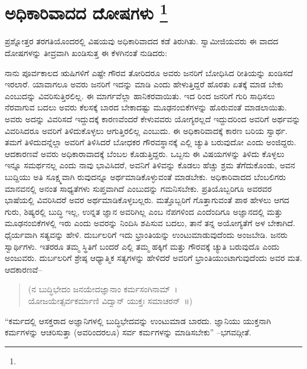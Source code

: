 
\chapter[ಅಧಿಕಾರಿವಾದದ ದೋಷಗಳು ]{ಅಧಿಕಾರಿವಾದದ ದೋಷಗಳು \protect\footnote{}}

ಪ್ರಶ್ನೋತ್ತರ ತರಗತಿಯೊಂದರಲ್ಲಿ ವಿಷಯವು ಅಧಿಕಾರಿವಾದದ ಕಡೆ ತಿರುಗಿತು. ಸ್ವಾಮೀಜಿಯವರು ಈ ವಾದದ ದೋಷಗಳನ್ನು ತೀವ್ರವಾಗಿ ಖಂಡಿಸುತ್ತ ಈ ಕೆಳಗಿನಂತೆ ನುಡಿದರು:

ನಾನು ಪೂರ್ವಕಾಲದ ಋಷಿಗಳಿಗೆ ಎಷ್ಟೇ ಗೌರವ ತೋರಿದರೂ ಅವರು ಜನರಿಗೆ ಬೋಧಿಸಿದ ರೀತಿಯನ್ನು ಖಂಡಿಸದೆ ಇರಲಾರೆ. ಯಾವಾಗಲೂ ಅವರು ಜನರಿಗೆ ಇದನ್ನು ಮಾಡಿ ಎಂದು ಹೇಳುತ್ತಿದ್ದರೆ ಹೊರತು ಏತಕ್ಕೆ ಮಾಡ ಬೇಕು ಎಂಬುದನ್ನು ವಿವರಿಸುತ್ತಿರಲಿಲ್ಲ. ಈ ಮಾರ್ಗವೆಲ್ಲಾ ಹಾನಿಕರವಾಯಿತು. ಇದ ರಿಂದ ಜನರಿಗೆ ಗುರಿ ಸಾಧಿಸಲು ನೆರವಾಗುವ ಬದಲು ಅವರು ಕೆಲಸಕ್ಕೆ ಬಾರದ ಬೇಕಾದಷ್ಟು ಮೂಢನಂಬಿಕೆಗಳನ್ನು ಹೊರುವಂತೆ ಮಾಡಲಾಯಿತು. ಅವರು ಅದನ್ನು ವಿವರಿಸದೆ ಇದ್ದುದಕ್ಕೆ ಕಾರಣವೆಂದರೆ ಕೇಳುವವರು ಯೋಗ್ಯರಲ್ಲದೆ ಇದ್ದುದರಿಂದ ಅವರಿಗೆ ಅರ್ಥವನ್ನು ವಿವರಿಸಿದರೂ ಅವರಿಗೆ ತಿಳಿದುಕೊಳ್ಳಲು ಆಗುತ್ತಿರಲಿಲ್ಲ ಎಂಬುದು. ಈ ಅಧಿಕಾರಿವಾದಕ್ಕೆ ಕಾರಣ ಬರಿಯ ಸ್ವಾರ್ಥ. ತಮಗೆ ತಿಳಿದುದನ್ನೆಲ್ಲಾ ಅವರಿಗೆ ತಿಳಿಸಿದರೆ ಬೋಧಕರ ಗೌರವಸ್ಥಾನಕ್ಕೆ ಎಲ್ಲಿ ಚ್ಯುತಿ ಬರುವುದೋ ಎಂದು ಅಂಜಿದ್ದರು. ಆದಕಾರಣವೆ ಅವರು ಅಧಿಕಾರಾವಾದಕ್ಕೆ ಬೆಂಬಲ ಕೊಡುತ್ತಿದ್ದರು. ಒಬ್ಬನು ಈ ವಿಷಯಗಳನ್ನು ತಿಳಿದು ಕೊಳ್ಳಲು ಇನ್ನೂ ಸಮರ್ಥನಲ್ಲ ಎಂದು ನಾವು ಭಾವಿಸಿದರೆ, ಅವನಿಗೆ ತಿಳಿವನ್ನು ಕೊಡಲು ಹೆಚ್ಚು ಶ್ರಮ ತೆಗೆದುಕೊಂಡು, ಅವನ ಬುದ್ದಿಯು ಅತಿ ಸೂಕ್ಷ್ಮವಾಗಿ ರುವುದನ್ನೂ ಅರ್ಥಮಾಡಿಕೊಳ್ಳುವಂತೆ ಮಾಡಬೇಕು. ಅಧಿಕಾರಿವಾದದ ಬೆಂಬಲಿಗರು ಮಾನವನಲ್ಲಿ ಅನಂತ ಸಾಧ್ಯತೆಗಳು ಸುಪ್ತವಾಗಿದೆ ಎಂಬುದನ್ನು ಗಮನಿಸಬೇಕು. ಪ್ರತಿಯೊಬ್ಬರಿಗೂ ಅವರವರ ಭಾಷೆಯಲ್ಲಿ ವಿವರಿಸಿದರೆ ಅವರ ಅರ್ಥಮಾಡಿಕೊಳ್ಳಬಲ್ಲರು. ಮತ್ತೊಬ್ಬರಿಗೆ ಗೊತ್ತಾಗುವಂತೆ ಪಾಠ ಹೇಳಲು ಆಗದ ಗುರು, ಶಿಷ್ಯರಲ್ಲಿ ಬುದ್ಧಿ ಇಲ್ಲ, ಉನ್ನತ ಜ್ಞಾನ ಅವರಿಗಿಲ್ಲ ಎಂಬ ನೆಪಗಳಿಂದ ಎಂದೆಂದಿಗೂ ಅಜ್ಞಾನದಲ್ಲಿ ಮತ್ತು ಮೂಢನಂಬಿಕೆಗಳಲ್ಲಿ ಇರು ಎಂದು ಅವರನ್ನು ನಿಂದಿಸಿ ಶಪಿಸುವ ಬದಲು, ತಾನೆ ತನ್ನ ಅಯೋಗ್ಯತೆಗೆ ಅಳ ಬೇಕಾಗಿದೆ. ಧೈರ್ಯವಾಗಿ ಸತ್ಯವನ್ನು ಹೇಳಿ. ದುರ್ಬಲರಿಗೆ ಇದು ಭ್ರಾಂತಿಯನ್ನು ಉಂಟುಮಾಡುವುದೆಂದು ಅಂಜಬೇಡಿ. ಜನರು ಸ್ವಾರ್ಥಿಗಳು. ಇತರರೂ ತಮ್ಮ ಸ್ಥಿತಿಗೆ ಬಂದರೆ ಎಲ್ಲಿ ತಮ್ಮ ಹಕ್ಕಿಗೆ ಮತ್ತು ಗೌರವಕ್ಕೆ ಚ್ಯುತಿ ಬರುವುದೊ ಎಂದು ಅಂಜುವರು. ದುರ್ಬಲರಿಗೆ ಶ್ರೇಷ್ಠ ಆಧ್ಯಾತ್ಮಿಕ ಸತ್ಯಗಳನ್ನು ಹೇಳಿದರೆ ಅವರಿಗೆ ಭ್ರಾಂತಿಯುಂಟಾಗುವುದೆಂದು ಅವರ ಮತ. ಆದಕಾರಣವೆ–

\begin{verse}
(ನ ಬುದ್ಧಿಭೇದಂ ಜನಯೇದಜ್ಞಾನಾಂ ಕರ್ಮಸಂಗಿನಾಮ್​~।\\ಯೋಜಯೇತ್ಸರ್ವಕರ್ಮಾಣಿ ವಿದ್ವಾನ್​ ಯುಕ್ತಃ ಸಮಾಚರನ್​~॥)
\end{verse}

“ಕರ್ಮದಲ್ಲಿ ಆಸಕ್ತರಾದ ಅಜ್ಞಾನಿಗಳಲ್ಲಿ ಬುದ್ಧಿಭೇದವನ್ನು ಉಂಟುಮಾಡ ಬಾರದು. ಜ್ಞಾನಿಯು ಯುಕ್ತನಾಗಿ ಕರ್ಮಗಳನ್ನು ಆಚರಿಸುತ್ತಾ (ಅವರಿಂದರಲೂ) ಸರ್ವ ಕರ್ಮಗಳನ್ನು ಮಾಡಿಸಬೇಕು” –ಭಗವದ್ಗೀತೆ.

